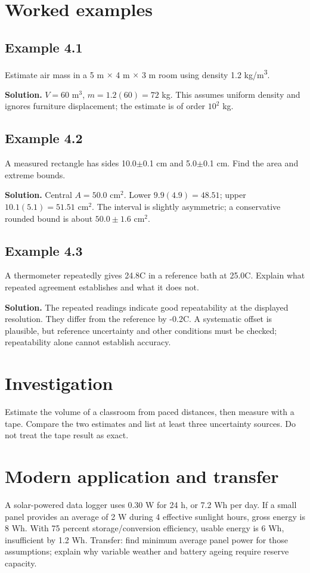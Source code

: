 \documentclass[11pt,a4paper,openany]{book}
\begin{document}
\section{Worked examples}
\subsection*{Example 4.1}
Estimate air mass in a 5 m \ensuremath{\times} 4 m \ensuremath{\times} 3 m room using density 1.2 kg/m\textsuperscript{3}.

\textbf{Solution.} $V=60$ m$^3$, $m=1.2(60)=72$ kg. This assumes uniform density and ignores furniture displacement; the estimate is of order $10^2$ kg.
\subsection*{Example 4.2}
A measured rectangle has sides 10.0\ensuremath{\pm}0.1 cm and 5.0\ensuremath{\pm}0.1 cm. Find the area and extreme bounds.

\textbf{Solution.} Central $A=50.0$ cm$^2$. Lower $9.9(4.9)=48.51$; upper $10.1(5.1)=51.51$ cm$^2$. The interval is slightly asymmetric; a conservative rounded bound is about $50.0\pm1.6$ cm$^2$.
\subsection*{Example 4.3}
A thermometer repeatedly gives 24.8\textdegree{}C in a reference bath at 25.0\textdegree{}C. Explain what repeated agreement establishes and what it does not.

\textbf{Solution.} The repeated readings indicate good repeatability at the displayed resolution. They differ from the reference by -0.2\textdegree{}C. A systematic offset is plausible, but reference uncertainty and other conditions must be checked; repeatability alone cannot establish accuracy.
\section{Investigation}
Estimate the volume of a classroom from paced distances, then measure with a tape. Compare the two estimates and list at least three uncertainty sources. Do not treat the tape result as exact.
\section{Modern application and transfer}
A solar-powered data logger uses 0.30 W for 24 h, or 7.2 Wh per day. If a small panel provides an average of 2 W during 4 effective sunlight hours, gross energy is 8 Wh. With 75 percent storage/conversion efficiency, usable energy is 6 Wh, insufficient by 1.2 Wh. Transfer: find minimum average panel power for those assumptions; explain why variable weather and battery ageing require reserve capacity.
\end{document}
